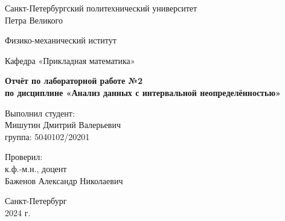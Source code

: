 \begin{titlepage}
  \begin{center}
    {\large Санкт-Петербургский политехнический университет\\Петра Великого\\}
  \end{center}

  \begin{center}
    {\large Физико-механический иститут}
  \end{center}


  \begin{center}
    {\large Кафедра «Прикладная математика»}
  \end{center}

  \vspace{8em}

  \begin{center}
    {\bfseries Отчёт по лабораторной работе №2 \\по дисциплине «Анализ данных с интервальной неопределённостью»}
  \end{center}

  \vspace{5em}

  \begin{flushleft}
    \hspace{16em}Выполнил студент:\\\hspace{16em}Мишутин Дмитрий Валерьевич\\\hspace{16em}группа: 5040102/20201

    \vspace{2em}

    \hspace{16em}Проверил:\\\hspace{16em}к.ф.-м.н., доцент\\\hspace{16em}Баженов Александр Николаевич

  \end{flushleft}


  \vspace{6em}


  \begin{center}
    Санкт-Петербург\\2024 г.
  \end{center}

\end{titlepage}
